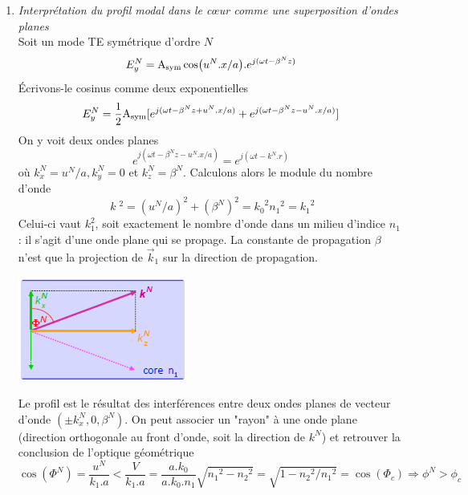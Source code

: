 \begin{enumerate}
\item \textit{Interprétation du profil modal dans le cœur comme une superposition d'ondes planes}\\
Soit un mode TE symétrique d'ordre $N$
\begin{equation}
E_y^N = {{\rm{A}}_{{\rm{sym}}}}\cos ({u^N}.x/a).{e^{j(\omega t - {\beta ^N}z)}}
\end{equation}
Écrivons-le cosinus comme deux exponentielles 
\begin{equation}
E_y^N = \frac{1}{2}{{\rm{A}}_{{\rm{sym}}}}[{e^{j(\omega t - {\beta ^N}z + {u^N}.x/a)}} + {e^{j(\omega t - {\beta ^N}z - {u^N}.x/a)}}]
\end{equation}
On y voit deux ondes planes
\begin{equation}
{e^{j(\omega t - {\beta ^N}z - {u^N}.x/a)}} = {e^{j(\omega t - {k^N}.r)}}
\end{equation}
où $k_x^N = u^N/a, k_y^N=0$ et $k_z^N=\beta^N$. Calculons alors le module du nombre d'onde
\begin{equation}
\;k\;{^2} = {({u^N}/a)^2} + {({\beta ^N})^2} = {k_0}^2{n_1}^2 = {k_1}^2
\end{equation}
Celui-ci vaut $k_1^2$, soit exactement le nombre d'onde dans un milieu d'indice $n_1$ : il s'agit
d'une onde plane qui se propage.  La constante de propagation $\beta$ n'est que la projection de 
$\vec k_1$ sur la direction de propagation. 

\begin{center}
	\includegraphics[scale=0.75]{ch1/image18}
\end{center}

Le profil est le résultat des interférences entre
deux ondes planes de vecteur d'onde $(\pm k_x^N,0,\beta^N)$. On peut associer un "rayon" à une
onde plane (direction orthogonale au front d'onde, soit la direction de $k^N$) et retrouver la 
conclusion de l'optique géométrique 
\begin{equation}
\cos ({\Phi ^N}) = \frac{{{u^N}}}{{{k_1}.a}} < \frac{V}{{{k_1}.a}} = \frac{{a.{k_0}}}{{a.{k_0}.{n_1}}}\sqrt {{n_1}^2 - {n_2}^2}  = \sqrt {1 - {n_2}^2/{n_1}^2}  = \cos ({\Phi _c})\Rightarrow
\phi^N > \phi_c
\end{equation}


\end{enumerate}
